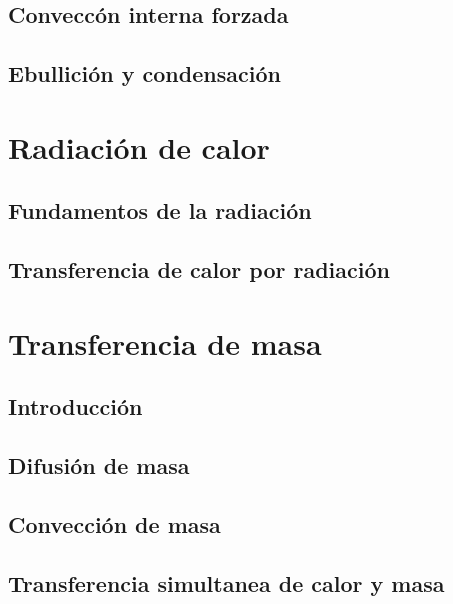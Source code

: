 \documentclass[11pt]{report}
\theoremstyle{plain}
\theoremstyle{definition}
\begin{document}
\section{Conveccón interna forzada}
%
\section{Ebullición y condensación}


\chapter{Radiación de calor}
%
\section{Fundamentos de la radiación}
%
\section{Transferencia de calor por radiación}


\chapter{Transferencia de masa}
%
\section{Introducción}
%
\section{Difusión de masa}
%
\section{Convección de masa}
%
\section{Transferencia simultanea de calor y masa}


\end{document}
